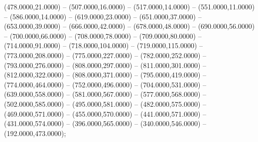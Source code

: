 \begin{scope}[shift={(-190.875,-10.875)}]
\begin{scope}[draw=black,fill=c0f7296,line join=round,line width=0.208pt]
        (478.0000,21.0000) -- (507.0000,16.0000) -- (517.0000,14.0000) --
        (551.0000,11.0000) -- (586.0000,14.0000) -- (619.0000,23.0000) --
        (651.0000,37.0000) -- (653.0000,39.0000) -- (666.0000,42.0000) --
        (678.0000,48.0000) -- (690.0000,56.0000) -- (700.0000,66.0000) --
        (708.0000,78.0000) -- (709.0000,80.0000) -- (714.0000,91.0000) --
        (718.0000,104.0000) -- (719.0000,115.0000) -- (773.0000,208.0000) --
        (775.0000,227.0000) -- (782.0000,252.0000) -- (793.0000,276.0000) --
        (808.0000,297.0000) -- (811.0000,301.0000) -- (812.0000,322.0000) --
        (808.0000,371.0000) -- (795.0000,419.0000) -- (774.0000,464.0000) --
        (752.0000,496.0000) -- (704.0000,531.0000) -- (639.0000,558.0000) --
        (581.0000,567.0000) -- (577.0000,568.0000) -- (502.0000,585.0000) --
        (495.0000,581.0000) -- (482.0000,575.0000) -- (469.0000,571.0000) --
        (455.0000,570.0000) -- (441.0000,571.0000) -- (431.0000,574.0000) --
        (396.0000,565.0000) -- (340.0000,546.0000) -- (192.0000,473.0000);
  \end{scope}
\end{scope}
\begin{scope}[shift={(-190.875,-10.875)},draw=cff0000,line width=0.800pt]
\end{scope}
